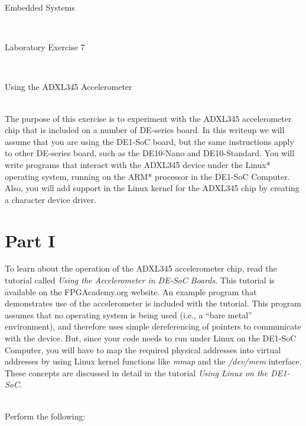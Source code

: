 \documentclass[epsfig,10pt,fullpage]{article}
\newcommand{\LabNum}{7}
\begin{document}
\centerline{\huge Embedded Systems}
~\\
\centerline{\huge Laboratory Exercise \LabNum}
~\\
\centerline{\large Using the ADXL345 Accelerometer}
~\\

\noindent
The purpose of this exercise is to experiment with the ADXL345 accelerometer chip that is
included on a number of DE-series board. In this writeup we will assume that you are using 
the DE1-SoC board, but the same instructions apply to other DE-series board, such as the DE10-Nano
and DE10-Standard. You will write programs that interact with the ADXL345 device under 
the Linux* operating system, running on the ARM* processor in the DE1-SoC Computer. Also, 
you will add support in the Linux kernel for the ADXL345 chip by creating a character device
driver.

\noindent
\section*{Part I}

\noindent
To learn about the operation of the ADXL345 accelerometer chip, read the tutorial called
{\it Using the Accelerometer in DE-SoC Boards}. This tutorial is available on the 
FPGAcademy.org website. An example program that demonstrates use of the accelerometer
is included with the tutorial.  This program assumes that no operating system is
being used (i.e., a ``bare metal'' environment), and therefore uses simple dereferencing of 
pointers to communicate with the device. But, since your code needs to run under Linux on the
DE1-SoC Computer, you will have to map the required physical addresses into virtual addresses
by using Linux kernel functions like {\it mmap} and the {\it /dev/mem} interface.
These concepts are discussed in detail in the tutorial {\it Using Linux on the DE1-SoC}.

~\\
\noindent
Perform the following:
\end{document}
